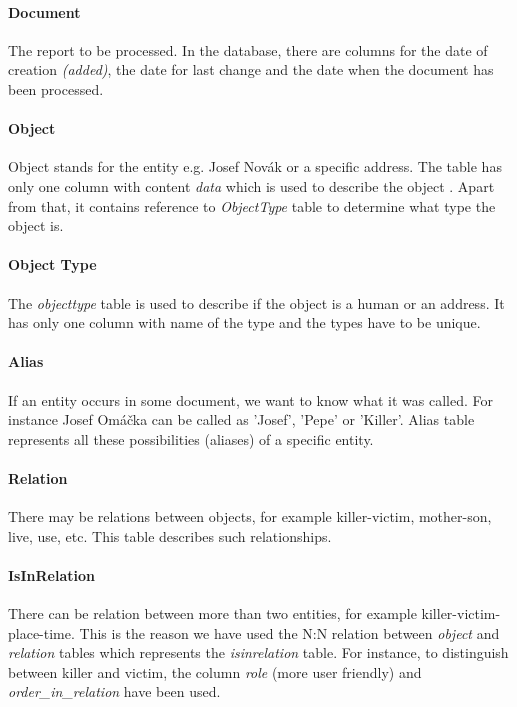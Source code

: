 \paragraph{Document} The report to be processed. In the database, there are
columns for the date of  creation \emph{(added)}, the date for last change and the date when the document has been processed.

\paragraph{Object} Object stands for the entity e.g. Josef Novák or a specific
address.  The table has only one column with content \emph{data} which is used
to describe the object . Apart
from that, it contains reference to \emph{ObjectType} table to determine what
type the object is.

\paragraph{Object Type} The \emph{objecttype} table is used to describe if the
object is a human or an address. It has only one column  with name of the type and the types have to be
unique.

\paragraph{Alias} If an entity occurs in some document, we want to know what it
was called. For instance Josef Omáčka can be called as 'Josef', 'Pepe' or
'Killer'. Alias table represents all these possibilities (aliases) 
of a specific entity.

\paragraph{Relation} There may be relations between objects, for example
killer-victim, mother-son, live, use, etc. This table describes such
relationships. 

\paragraph{IsInRelation} There can be relation between more than two entities,
for example  killer-victim-place-time. This is the reason we have used the N:N
relation  between \emph{object} and \emph{relation} tables which represents the
\emph{isinrelation} table. For instance, to distinguish between killer and
victim, the column \emph{role} (more user friendly) and
\emph{order\_{}in\_{}relation} have been used.

